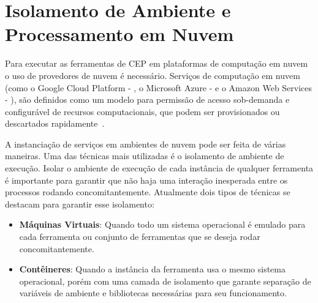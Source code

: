 \section{Isolamento de Ambiente e Processamento em Nuvem}
\label{sec:cloudtools}

Para executar as ferramentas de CEP em plataformas de computação em nuvem o uso de provedores de nuvem é necessário. Serviços de computação em nuvem (como o Google Cloud Platform - \cite{GCP} , o Microsoft Azure - \cite{Azure} e o Amazon Web Services - \cite{AWS}), são definidos como um modelo para permissão de acesso sob-demanda e configurável de recursos computacionais, que podem ser provisionados ou descartados rapidamente~\citep{CLoudComputing}. 











A instanciação de serviços em ambientes de nuvem pode ser feita de várias maneiras. Uma das técnicas mais utilizadas é o isolamento de ambiente de execução. Isolar o ambiente de execução de cada instância de qualquer ferramenta é importante para garantir que não haja uma interação inesperada entre os processos rodando concomitantemente.
Atualmente dois tipos de técnicas se destacam para garantir esse isolamento:
\begin{itemize}
    \item \textbf{Máquinas Virtuais}: Quando todo um sistema operacional é emulado para cada ferramenta ou conjunto de ferramentas que se deseja rodar concomitantemente. 
    \item \textbf{Contêineres}: Quando a instância da ferramenta usa o mesmo sistema operacional, porém com uma camada de isolamento que garante separação de variáveis de ambiente e bibliotecas necessárias para seu funcionamento.
\end{itemize}

